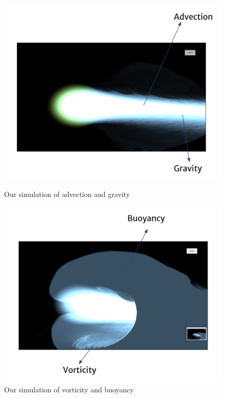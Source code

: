 \documentclass[sigconf]{acmart}
\begin{document}
\begin{figure}[!htbp]
\centering
        \includegraphics[width=\linewidth]{images/simulation1.png}
    \caption{Our simulation of advection and gravity}
    \label{fig:verticalcell}
\bigbreak
\centering
        \includegraphics[width=\linewidth]{images/simulation2.png}
    \caption{Our simulation of vorticity and buoyancy}
    \label{fig:verticalcell}
\end{figure}


\newpage


\end{document}
